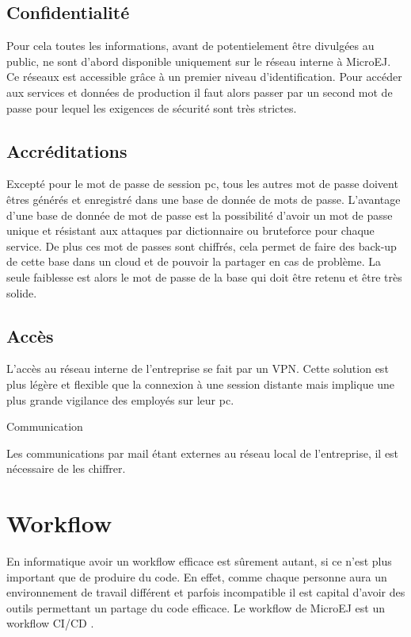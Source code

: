 \documentclass[french,a4paper,12pt]{report}
\begin{document}
\subsection{Confidentialité}

Pour cela toutes les informations, avant de potentielement être divulgées au public, ne sont d'abord disponible uniquement sur le réseau interne à MicroEJ. Ce réseaux est accessible grâce à un premier niveau d'identification. Pour accéder aux services et données de production il faut alors passer par un second mot de passe pour lequel les exigences de sécurité sont très strictes.


\subsection{Accréditations}

Excepté pour le mot de passe de session pc, tous les autres mot de passe doivent êtres générés et enregistré dans une base de donnée de mots de passe. L’avantage d’une base de donnée de mot de passe est la possibilité d’avoir un mot de passe unique et résistant aux attaques par dictionnaire ou bruteforce pour chaque service. De plus ces mot de passes sont chiffrés, cela permet de faire des back-up de cette base dans un cloud et de pouvoir la partager en cas de problème. La seule faiblesse est alors le mot de passe de la base qui doit être retenu et être très solide.

\subsection{Accès}

L’accès au réseau interne de l’entreprise se fait par un VPN. Cette solution est plus légère et flexible que la connexion à une session distante mais implique une plus grande vigilance des employés sur leur pc. 

Communication

Les communications par mail étant externes au réseau local de l’entreprise, il est nécessaire de les chiffrer.  

\section{Workflow}

En informatique avoir un workflow efficace est sûrement autant, si ce n’est plus important que de produire du code. En effet, comme chaque personne aura un environnement de travail différent et parfois incompatible il est capital d’avoir des outils permettant un partage du code efficace. Le workflow de MicroEJ est un workflow CI/CD .
\end{document}
